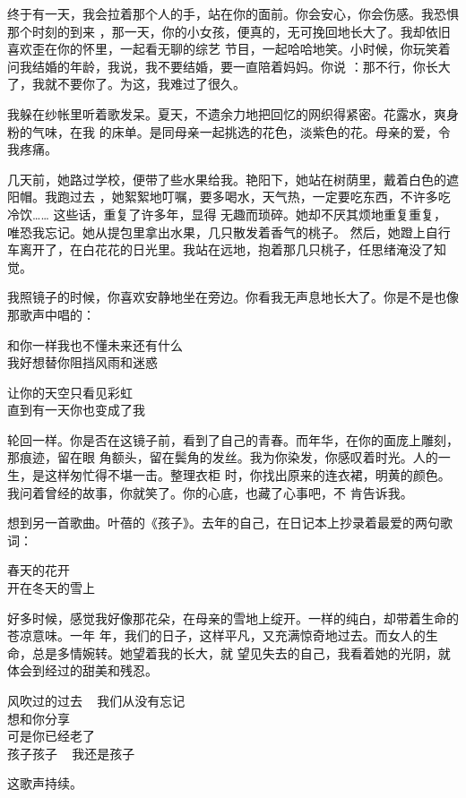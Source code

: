 \documentclass[12pt,a4paper]{article}
\begin{document}
		终于有一天，我会拉着那个人的手，站在你的面前。你会安心，你会伤感。我恐惧那个时刻的到来
	，那一天，你的小女孩，便真的，无可挽回地长大了。我却依旧喜欢歪在你的怀里，一起看无聊的综艺
	节目，一起哈哈地笑。小时候，你玩笑着问我结婚的年龄，我说，我不要结婚，要一直陪着妈妈。你说
	：那不行，你长大了，我就不要你了。为这，我难过了很久。

		我躲在纱帐里听着歌发呆。夏天，不遗余力地把回忆的网织得紧密。花露水，爽身粉的气味，在我
	的床单。是同母亲一起挑选的花色，淡紫色的花。母亲的爱，令我疼痛。

		几天前，她路过学校，便带了些水果给我。艳阳下，她站在树荫里，戴着白色的遮阳帽。我跑过去
	，她絮絮地叮嘱，要多喝水，天气热，一定要吃东西，不许多吃冷饮…… 这些话，重复了许多年，显得
	无趣而琐碎。她却不厌其烦地重复重复，唯恐我忘记。她从提包里拿出水果，几只散发着香气的桃子。
	然后，她蹬上自行车离开了，在白花花的日光里。我站在远地，抱着那几只桃子，任思绪淹没了知觉。


		我照镜子的时候，你喜欢安静地坐在旁边。你看我无声息地长大了。你是不是也像那歌声中唱的：

		\longpoem{}{}{}
		和你一样我也不懂未来还有什么 \\
		我好想替你阻挡风雨和迷惑

		让你的天空只看见彩虹 \\
		直到有一天你也变成了我
		\endlongpoem

		轮回一样。你是否在这镜子前，看到了自己的青春。而年华，在你的面庞上雕刻，那痕迹，留在眼
	角额头，留在鬓角的发丝。我为你染发，你感叹着时光。人的一生，是这样匆忙得不堪一击。整理衣柜
	时，你找出原来的连衣裙，明黄的颜色。我问着曾经的故事，你就笑了。你的心底，也藏了心事吧，不
	肯告诉我。

		想到另一首歌曲。叶蓓的《孩子》。去年的自己，在日记本上抄录着最爱的两句歌词：

		\longpoem{}{}{}
		春天的花开 \\
		开在冬天的雪上
		\endlongpoem


		好多时候，感觉我好像那花朵，在母亲的雪地上绽开。一样的纯白，却带着生命的苍凉意味。一年
	年，我们的日子，这样平凡，又充满惊奇地过去。而女人的生命，总是多情婉转。她望着我的长大，就
	望见失去的自己，我看着她的光阴，就体会到经过的甜美和残忍。

		\longpoem{}{}{}
		风吹过的过去 ~ 我们从没有忘记 \\
		想和你分享 \\
		可是你已经老了 \\
		孩子孩子 ~ 我还是孩子
		\endlongpoem

		这歌声持续。
\end{document}
